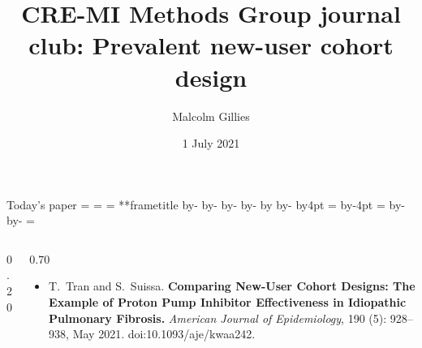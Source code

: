 \documentclass[aspectratio=169,12pt]{beamer} %
\title{CRE-MI Methods Group journal club: Prevalent new-user cohort design}
\author{Malcolm Gillies}
\date{1 July 2021}
\makeatletter
\newif\ifsidebartheme
\newcommand*{\calculatespace}{%
    \contentheight=\paperheight%
    \ifx\beamer@frametitle\@empty%
        \setbox\@tempboxa=\box\voidb@x%
      \else%
        \setbox\@tempboxa=\vbox{%
          \vbox{}%
          {\parskip0pt\usebeamertemplate***{frametitle}}%
        }%
        \ifsidebartheme%
          \advance\contentheight by-1em%
        \fi%
      \fi%
    \advance\contentheight by-\ht\@tempboxa%
    \advance\contentheight by-\dp\@tempboxa%
    \advance\contentheight by-\beamer@frametopskip%
    \ifbeamer@plainframe%
    \contentbottom=0pt%
    \else%
    \advance\contentheight by-\headheight%
    \advance\contentheight by\headdp%
    \advance\contentheight by-\footheight%
    \advance\contentheight by4pt%
    \contentbottom=\footheight%
    \advance\contentbottom by-4pt%
    \fi%
    \contentwidth=\paperwidth%
    \ifbeamer@plainframe%
    \contentleft=0pt%
    \else%
    \advance\contentwidth by-\beamer@rightsidebar%
    \advance\contentwidth by-\beamer@leftsidebar\relax%
    \contentleft=\beamer@leftsidebar%
    \fi%
}
\makeatother
\begin{document}
{
\begin{frame}
\titlepage
\end{frame}
}

\begin{frame}{Today's paper}
\calculatespace%
\begin{columns}
\begin{column}{0.20\contentwidth}
\end{column}
\begin{column}{0.70\contentwidth}
	\begin{itemize}
		\item T.~Tran and S.~Suissa. \textbf{Comparing {New}-{User} {Cohort} {Designs}: {The} {Example} of {Proton} {Pump} {Inhibitor} {Effectiveness} in {Idiopathic} {Pulmonary} {Fibrosis}.} \emph{American Journal of Epidemiology}, 190 (5): 928--938, May 2021. doi:10.1093/aje/kwaa242.
\nocite{tran_comparing_2021}
	\end{itemize}
\end{column}
\end{columns}
\end{frame}
\end{document}
